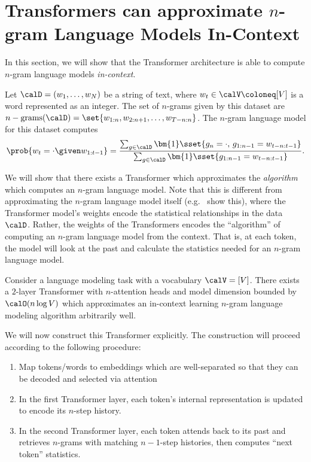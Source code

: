 \section{Transformers can approximate $n$-gram Language Models In-Context}

In this section, we will show that the Transformer architecture is able to compute $n$-gram language models \textit{in-context}.

\begin{definition}
    Let $\calD = (w_1, \ldots, w_N)$ be a string of text, where $w_t \in \calV \coloneq [V]$ is a word represented as an integer. The set of $n$-grams given by this dataset are $n-\text{grams}(\calD) = \set{w_{1:n}, w_{2:n+1}, \ldots, w_{T-n:n}}$. The $n$-gram language model for this dataset computes
    \begin{equation*}
        \prob{w_{t} = \cdot \given w_{1:t-1}} = \frac{\sum_{g \in \calD} \bm{1}\sset{g_n = \cdot,\, g_{1:n-1}= w_{t-n:t-1}}}{\sum_{g \in \calD} \bm{1}\sset{g_{1:n-1}= w_{t-n:t-1}}}.
    \end{equation*}
\end{definition}

We will show that there exists a Transformer which approximates the \textit{algorithm} which computes an $n$-gram language model. Note that this is different from approximating the $n$-gram language model itself (e.g.~\citet{svete2024transformers} show this), where the Transformer model's weights encode the statistical relationships in the data $\calD$. Rather, the weights of the Transformers encodes the ``algorithm'' of computing an $n$-gram language model from the context. That is, at each token, the model will look at the past and calculate the statistics needed for an $n$-gram language model.

\begin{theorem}
    Consider a language modeling task with a vocabulary $\calV = [V]$. There exists a $2$-layer Transformer with $n$-attention heads and model dimension bounded by $\calO(n \log V)$ which approximates an in-context learning $n$-gram language modeling algorithm arbitrarily well.
\end{theorem}

We will now construct this Transformer explicitly. The construction will proceed according to the following procedure:

\begin{enumerate}
    \item Map tokens/words to embeddings which are well-separated so that they can be decoded and selected via attention
    \item In the first Transformer layer, each token's internal representation is updated to encode its $n$-step history.
    \item In the second Transformer layer, each token attends back to its past and retrieves $n$-grams with matching $n-1$-step histories, then computes ``next token'' statistics.
\end{enumerate}

